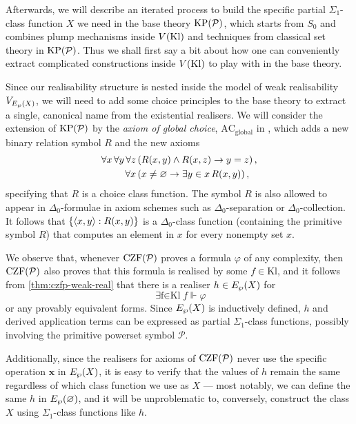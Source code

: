 \documentclass[12pt,openany]{book}
\makeatletter
\newcommand\inds[1]{\index{C@Set theory!#1}}
\theoremstyle{plain}
\theoremstyle{definition}
\newcommand\tuple[1]{\left\langle #1 \right\rangle}
\newcommand\opA[1]{\mathop{\forall #1}}
\newcommand\opE[1]{\mathop{\exists #1}}
\newcommand\Pow{\mathcal{P}}
\newcommand\KPP{\mathrm{KP}\mleft(\Pow\mright)}
\newcommand\CZFP{\mathrm{CZF}\mleft(\Pow\mright)}
\newcommand\ACg{\mathrm{AC}_\text{global}}
\newcommand\Kl{\mathrm{Kl}}
\newcommand\bx{\mathbf{x}}
\makeatother
\begin{document}
Afterwards, we will describe an iterated process to build the specific partial $\Sigma_1$-class function $X$ we need in the base theory $\KPP$, which starts from $S_0$ and combines plump mechanisms inside $V\mleft(\Kl\mright)$ and techniques from classical set theory in $\KPP$. Thus we shall first say a bit about how one can conveniently extract complicated constructions inside $V\mleft(\Kl\mright)$ to play with in the base theory.

Since our realisability structure is nested inside the model of weak realisability $V_{E_\wp\mleft(X\mright)}$, we will need to add some choice principles to the base theory to extract a single, canonical name from the existential realisers. We will consider the extension of $\KPP$ by the \emph{axiom of global choice}, $\ACg$\inds{axiom of global choice} in \cite{rathjen20-power-kp-choice}, which adds a new binary relation symbol $R$ and the new axioms
\begin{align*}
  \opA{x} \opA{y} \opA{z} & \left(R\mleft(x, y\mright) \land R\mleft(x, z\mright) \rightarrow y = z\right), \\
  \opA{x}                 & \left(x \neq \varnothing \rightarrow \opE{y \in x} R\mleft(x, y\mright)\right),
\end{align*}
specifying that $R$ is a choice class function. The symbol $R$ is also allowed to appear in $\Delta_0$-formulae in axiom schemes such as $\Delta_0$-separation or $\Delta_0$-collection. It follows that $\left\{\tuple{x, y} : R\mleft(x, y\mright)\right\}$ is a $\Delta_0$-class function (containing the primitive symbol $R$) that computes an element in $x$ for every nonempty set $x$.

We observe that, whenever $\CZFP$ proves a formula $\varphi$ of any complexity, then $\CZFP$ also proves that this formula is realised by some $f \in \Kl$, and it follows from \autoref{thm:czfp-weak-real} that there is a realiser $h \in E_\wp\mleft(X\mright)$ for
\[\opE{f \in \Kl} f \Vdash \varphi\]
or any provably equivalent forms. Since $E_\wp\mleft(X\mright)$ is inductively defined, $h$ and derived application terms can be expressed as partial $\Sigma_1$-class functions, possibly involving the primitive powerset symbol $\Pow$.

Additionally, since the realisers for axioms of $\CZFP$ never use the specific operation $\bx$ in $E_\wp\mleft(X\mright)$, it is easy to verify that the values of $h$ remain the same regardless of which class function we use as $X$ --- most notably, we can define the same $h$ in $E_\wp\mleft(\varnothing\mright)$, and it will be unproblematic to, conversely, construct the class $X$ using $\Sigma_1$-class functions like $h$.
\end{document}
